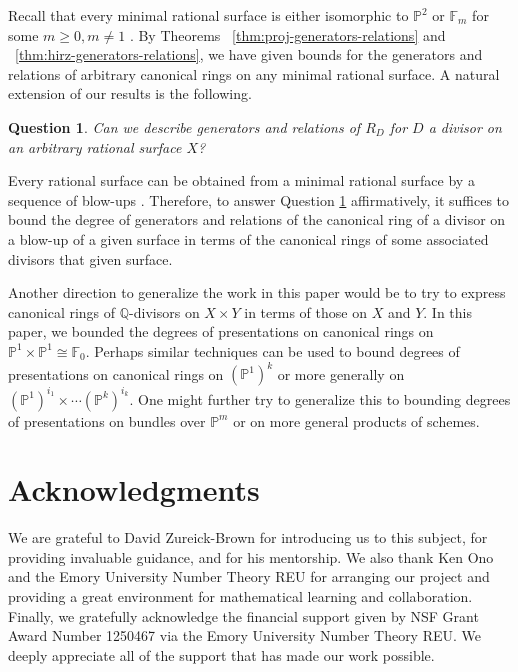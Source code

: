 \documentclass{amsart}
\theoremstyle{plain}
\newtheorem{question}[thm]{Question}
\theoremstyle{definition}
\theoremstyle{remark}
\numberwithin{equation}{section}
\newcommand\bq{{\mathbb Q}}
\newcommand\bp{{\mathbb P}}
\newcommand\hirz{\mathbb{F}}
\begin{document}
Recall that every minimal rational surface is either isomorphic to
$\bp^2$ or $\hirz_m$ for some $m \geq 0, m \neq 1$ \cite{eisenbud-harris:minimal}. By Theorems
~\ref{thm:proj-generators-relations} and ~\ref{thm:hirz-generators-relations}, we have given bounds for the generators and relations
of arbitrary canonical rings on any minimal rational surface. A
natural extension of our results is the following.
\begin{question}
\label{qn:general-minimal-surface}
Can we describe generators and relations of $R_D$ for $D$ a divisor on an
arbitrary rational surface $X$?
\end{question}

Every rational surface can be obtained from a minimal rational surface by a 
sequence of blow-ups \cite{eisenbud-harris:minimal}. Therefore, to answer
Question \ref{qn:general-minimal-surface} affirmatively, it suffices
to bound the degree of generators and relations of the 
canonical ring of a divisor on a blow-up of a given surface
in terms of the canonical
rings of some associated divisors that given surface.

Another direction to generalize the work in this paper
would be to try to express canonical rings of $\bq$-divisors on
$X \times Y$ in terms of those on $X$ and $Y$. In this paper,
we bounded the degrees of presentations on canonical rings on $\bp^1 \times \bp^1 \cong \hirz_0$.
Perhaps similar techniques can be used to bound
degrees of presentations on canonical rings on $(\bp^1)^k$ or
more generally on $(\bp^1)^{i_1} \times \cdots (\bp^k)^{i_k}.$
One might further try to generalize this to bounding degrees of presentations on bundles over $\bp^m$ or on more general
products of schemes.


\section{Acknowledgments}
\label{sec:ack}
We are grateful to David Zureick-Brown for introducing us to this
subject, for providing invaluable guidance,
and for his mentorship. We also thank Ken Ono and the
Emory University Number Theory REU for arranging our project and
providing a great environment for mathematical learning and
collaboration.
Finally, we gratefully acknowledge the financial support given by
NSF Grant Award Number 1250467 via the Emory University Number
Theory REU. We deeply appreciate all of the support that has made
our work possible.


\nocite{*}
{}

\end{document}
